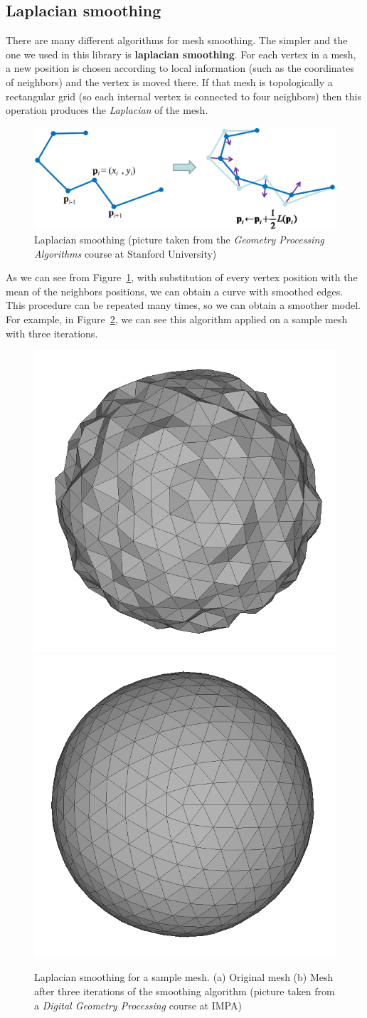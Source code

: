\documentclass[11pt,oneside]{article}	%
\begin{document}
\subsection{Laplacian smoothing}\label{sec:smoothing}

There are many different algorithms for mesh smoothing. The simpler and the one we used in this library is \textbf{laplacian smoothing}. For each vertex in a mesh, a new position is chosen according to local information (such as the coordinates of neighbors) and the vertex is moved there. If that mesh is topologically a rectangular grid (so each internal vertex is connected to four neighbors) then this operation produces the \textit{Laplacian} of the mesh.

\begin{figure}[htb] %
   \centering
   \includegraphics[width=0.60\linewidth]{images/LaplacianSmoothing.png}
   \caption{Laplacian smoothing (picture taken from the \textit{Geometry Processing Algorithms} course at Stanford University)}
   \label{fig:laplacianSmoothing}
\end{figure}

As we can see from Figure~\ref{fig:laplacianSmoothing}, with substitution of every vertex position with the mean of the neighbors positions, we can obtain a curve with smoothed edges. This procedure can be repeated many times, so we can obtain a smoother model. For example, in Figure~\ref{fig:smoothingExample}, we can see this algorithm applied on a sample mesh with three iterations.

\begin{figure}[htb] %
   \centering
   \includegraphics[width=0.30\linewidth]{images/SmoothingExample0.png}
   \includegraphics[width=0.30\linewidth]{images/SmoothingExample1.png}
   \caption{Laplacian smoothing for a sample mesh. (a) Original mesh (b) Mesh after three iterations of the smoothing algorithm (picture taken from a \textit{Digital Geometry Processing} course at IMPA)}
   \label{fig:smoothingExample}
\end{figure}
\end{document}
